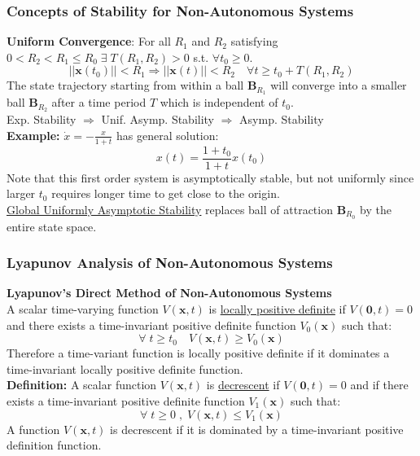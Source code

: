 \documentclass[11pt,handout]{beamer}   %
\begin{document}
\begin{frame}
\frametitle{Concepts of Stability for Non-Autonomous Systems}
\small
\textbf{Uniform Convergence}: For all $R_1$ and $R_2$ satisfying $0<R_2<R_1\leq R_0 \; \exists \; T(R_1,R_2) >0$ s.t. $\forall t_0 \geq 0$.
\begin{equation*}
||\mathbf{x}(t_0)|| < R_1 \Rightarrow ||\mathbf{x}(t)|| < R_2 \quad \forall t \geq t_0 + T(R_1,R_2)
\end{equation*}
The state trajectory starting from within a ball $\mathbf{B}_{R_1}$ will converge into a smaller ball $\mathbf{B}_{R_2}$ after a time period $T$ which is independent of $t_0$.\\
\vspace{6pt}
Exp. Stability $\Rightarrow$ Unif. Asymp. Stability $\Rightarrow$ Asymp. Stability\\
\vspace{6pt}
\textbf{Example:} $\dot{x} = - \frac{x}{1+t}$ has general solution:\\
\begin{equation*}
x(t) = \frac{1 + t_0}{1 + t} x(t_0)
\end{equation*}
Note that this first order system is asymptotically stable, but not uniformly since larger $t_0$ requires longer time to get close to the origin.\\
\vspace{6pt}
\underline{Global Uniformly Asymptotic Stability} replaces ball of attraction $\mathbf{B}_{R_0}$ by the entire state space.
\end{frame}

\begin{frame}
\frametitle{Lyapunov Analysis of Non-Autonomous Systems}
\small
\textbf{Lyapunov's Direct Method of Non-Autonomous Systems}\\
\vspace{3pt}
A scalar time-varying function $V(\mathbf{x},t)$ is \underline{locally positive definite} if $V( \mathbf{0},t) =0$ and there exists a time-invariant positive definite function $V_0(\mathbf{x})$ such that:
\begin{equation*}
\forall \; t \geq t_0 \quad V( \mathbf{x},t) \geq V_0(\mathbf{x})
\end{equation*}
Therefore a time-variant function is locally positive definite if it dominates a time-invariant locally positive definite function.\\
\vspace{6pt}
\textbf{Definition:} A scalar function  $V(\mathbf{x},t)$ is \underline {decrescent} if $V(\mathbf{0},t) = 0$ and if there exists a time-invariant positive definite function $V_1(\mathbf{x})$ such that:
\begin{equation*}
\forall \; t \geq 0 \;,\; V(\mathbf{x},t) \leq V_1(\mathbf{x})
\end{equation*}
A function $V(\mathbf{x},t)$ is decrescent if it is dominated by a time-invariant positive definition function.
\end{frame}
\end{document}
